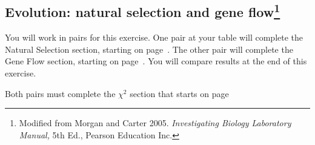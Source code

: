 \documentclass[12pt]{exam}
\begin{document}
\subsection*{Evolution: natural selection and gene flow\footnote{Modified from Morgan and Carter 2005. \emph{Investigating Biology Laboratory Manual,} 5th Ed., Pearson Education Inc.}}

You will work in pairs for this exercise. One pair at your table will complete the Natural Selection section, starting on page~\pageref{sec:natural_selection}. The other pair will complete the Gene Flow section, starting on page~\pageref{sec:gene_flow}. You will compare results at the end of this exercise.

Both pairs must complete the $\chi^2$ section that starts on page~\pageref{sec:chi_square}
\end{document}
